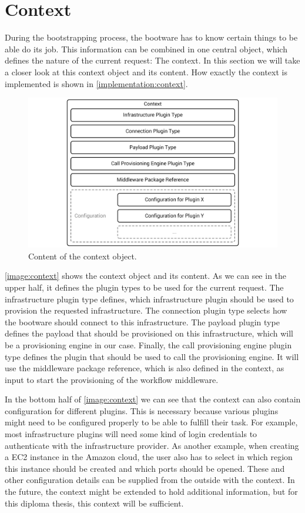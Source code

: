 \section{Context}
\label{design:context}

During the bootstrapping process, the bootware has to know certain things to be able do its job.
This information can be combined in one central object, which defines the nature of the current request: The context.
In this section we will take a closer look at this context object and its content.
How exactly the context is implemented is shown in \autoref{implementation:context}.

\begin{figure}[!htbp]
	\centering
	\includegraphics[resolution=600]{design/assets/context}
	\caption{Content of the context object.}
	\label{image:context}
\end{figure}

\autoref{image:context} shows the context object and its content.
As we can see in the upper half, it defines the plugin types to be used for the current request.
The infrastructure plugin type defines, which infrastructure plugin should be used to provision the requested infrastructure.
The connection plugin type selects how the bootware should connect to this infrastructure.
The payload plugin type defines the payload that should be provisioned on this infrastructure, which will be a provisioning engine in our case.
Finally, the call provisioning engine plugin type defines the plugin that should be used to call the provisioning engine.
It will use the middleware package reference, which is also defined in the context, as input to start the provisioning of the workflow middleware.

In the bottom half of \autoref{image:context} we can see that the context can also contain configuration for different plugins.
This is necessary because various plugins might need to be configured properly to be able to fulfill their task.
For example, most infrastructure plugins will need some kind of login credentials to authenticate with the infrastructure provider.
As another example, when creating a EC2 instance in the Amazon cloud, the user also has to select in which region this instance should be created and which ports should be opened.
These and other configuration details can be supplied from the outside with the context.
In the future, the context might be extended to hold additional information, but for this diploma thesis, this context will be sufficient.

